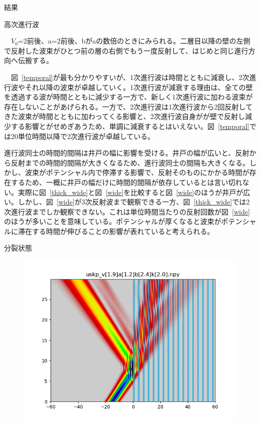\documentclass[a4paper, lualatex]{bxjsarticle}
\newcommand{\fref}[1]{図~\ref{#1}}
\begin{document}
\begin{section}{結果}
\begin{subsection}{高次進行波}
\begin{figure}[h]
\begin{minipage}{0.5\hsize}
            \end{minipage}
        \end{figure}
    \par　$V_0$=2前後、a=2前後、bがaの数倍のときにみられる。二層目以降の壁の左側で反射した波束がひとつ前の層の右側でもう一度反射して、はじめと同じ進行方向へ伝搬する。
    \par　\fref{temporal}が最も分かりやすいが、1次進行波は時間とともに減衰し、2次進行波やそれ以降の波束が卓越していく。1次進行波が減衰する理由は、全ての壁を透過する波が時間とともに減少する一方で、新しく1次進行波に加わる波束が存在しないことがあげられる。一方で、2次進行波は1次進行波から2回反射してきた波束が時間とともに加わってくる影響と、2次進行波自身がが壁で反射し減少する影響とがせめぎあうため、単調に減衰するとはいえない。\fref{temporal}では20単位時間以降で2次進行波が卓越している。
    \par 進行波同士の時間的間隔は井戸の幅に影響を受ける。井戸の幅が広いと、反射から反射までの時間的間隔が大きくなるため、進行波同士の間隔も大きくなる。しかし、波束がポテンシャル内で停滞する影響で、反射そのものにかかる時間が存在する\cite{Maeda, Goto}ため、一概に井戸の幅だけに時間的間隔が依存しているとは言い切れない。実際に\fref{thick_wide}と\fref{wide}を比較すると\fref{wide}のほうが井戸が広い。しかし、\fref{wide}が3次反射波まで観察できる一方、\fref{thick_wide}では2次進行波までしか観察できない。これは単位時間当たりの反射回数が\fref{wide}のほうが多いことを意味している。ポテンシャルが厚くなると波束がポテンシャルに滞在する時間が伸びることの影響が表れていると考えられる。
    \end{subsection}
    \begin{subsection}{分裂状態}
        \begin{figure}[h]
            \begin{minipage}{0.5\hsize}
                \centering
                \includegraphics[width=0.9\hsize]{bunretsu1.png}

\end{minipage}
\end{figure}
\end{subsection}
\end{section}
\end{document}
